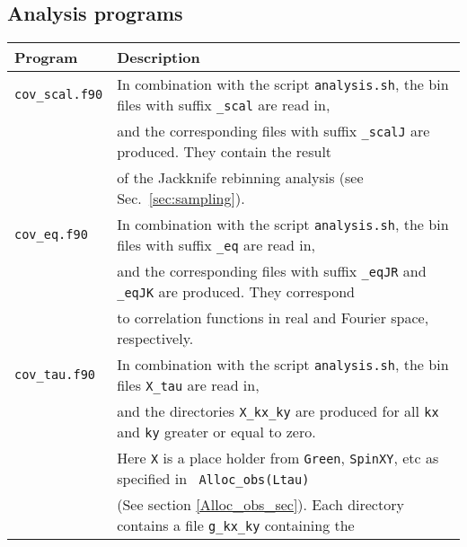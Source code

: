 
\subsection{ Analysis programs }\label{sec:analysis}
%
\begin{table}[h]
  \begin{tabular}{@{} l l @{}}\toprule
   Program & Description \\\midrule
   \texttt{cov\_scal.f90}  &  In combination with the script \texttt{analysis.sh}, the bin files with suffix \texttt{\_scal} are read in, \\
                           & and  the corresponding files with suffix \texttt{\_scalJ} are produced. They  contain the  result \\
                           & of the Jackknife rebinning analysis  (see Sec.~\ref{sec:sampling}).  \\
   \texttt{cov\_eq.f90}    &  In combination with the script \texttt{analysis.sh}, the bin files with suffix \texttt{\_eq} are read in, \\
                           & and the corresponding files with suffix  \texttt{\_eqJR}  and  \texttt{\_eqJK}  are produced. They  correspond \\
                           & to correlation functions in real and Fourier space, respectively.  \\
   \texttt{cov\_tau.f90}   &  In combination with the script \texttt{analysis.sh}, the bin files  \texttt{X\_tau} are read in, \\
                           & and the directories  \texttt{X\_kx\_ky} are produced  for all \texttt{kx} and \texttt{ky} greater or equal to zero. \\
                           & Here \texttt{X}  is a place holder from \texttt{Green}, \texttt{SpinXY}, etc   as specified in \texttt{ Alloc\_obs(Ltau)} \\
                           & (See section \ref{Alloc_obs_sec}). Each directory contains  a  file    \texttt{g\_kx\_ky}  containing the  \\

\end{tabular}
\end{table}
